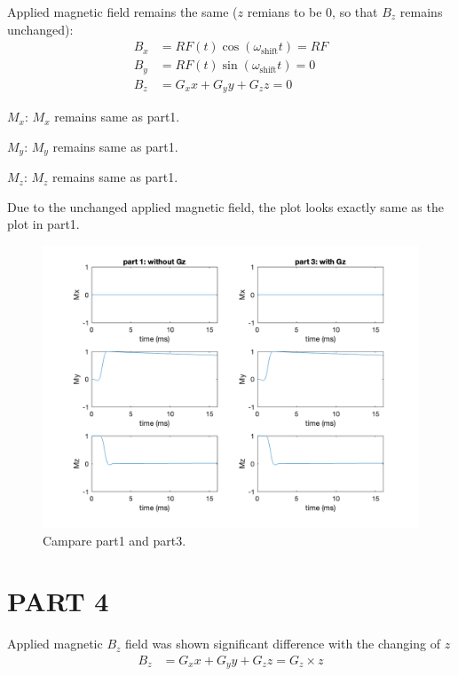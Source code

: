 \documentclass{report}
\begin{document}
Applied magnetic field remains the same ($z$ remians to be 0, so that $B_z$ remains unchanged):
\begin{align*}
B_x &= RF(t) \cos(\omega_{\text{shift}} t) = RF\\
B_y &= RF(t) \sin(\omega_{\text{shift}} t) = 0\\
B_z &= G_{x} x + G_{y} y + G_{z} z = 0
\end{align*}

$M_x$: $M_x$ remains same as part1.\vspace{\baselineskip}

$M_y$: $M_y$ remains same as part1.\vspace{\baselineskip}

$M_z$: $M_z$ remains same as part1.\vspace{\baselineskip}

Due to the unchanged applied magnetic field, the plot looks exactly same as the plot in part1.

\begin{figure}[hb]
    \centering
    \includegraphics[width=1\textwidth]{3.png}
    \caption{Campare part1 and part3.}
\end{figure}  
\newpage

\section[short]{PART 4}
Applied magnetic $B_z$ field was shown significant difference with the changing of $z$
\begin{align*}
    B_z &= G_{x} x + G_{y} y + G_{z} z = G_{z} \times z
\end{align*}
\end{document}
